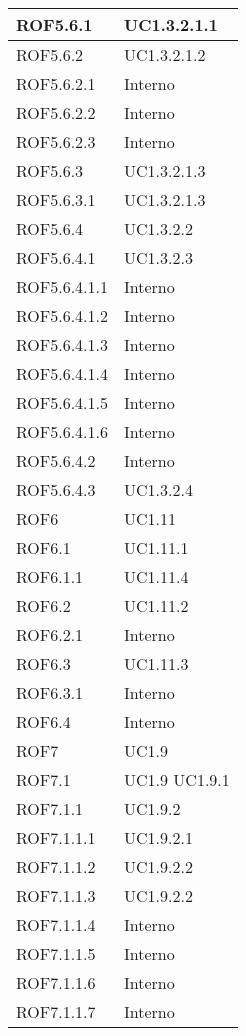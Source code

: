 \begin{center}
\begin{longtable}{| p{4cm} | p{4cm} |}
\hline
ROF5.6.1   &  UC1.3.2.1.1 \\
\hline
ROF5.6.2   &  UC1.3.2.1.2 \\
\hline
ROF5.6.2.1   &  Interno \\
\hline
ROF5.6.2.2   &  Interno \\
\hline
ROF5.6.2.3   &  Interno \\
\hline
ROF5.6.3   &  UC1.3.2.1.3 \\
\hline
ROF5.6.3.1   &  UC1.3.2.1.3 \\
\hline
ROF5.6.4   &  UC1.3.2.2 \\
\hline
ROF5.6.4.1   &  UC1.3.2.3 \\
\hline
ROF5.6.4.1.1   &  Interno \\
\hline
ROF5.6.4.1.2   &  Interno \\
\hline
ROF5.6.4.1.3   &  Interno \\
\hline
ROF5.6.4.1.4   &  Interno \\
\hline
ROF5.6.4.1.5   &  Interno \\
\hline
ROF5.6.4.1.6   &  Interno \\
\hline
ROF5.6.4.2   &  Interno \\
\hline
ROF5.6.4.3   &  UC1.3.2.4 \\
\hline
ROF6   &  UC1.11 \\
\hline
ROF6.1   &  UC1.11.1 \\
\hline
ROF6.1.1   &  UC1.11.4 \\
\hline
ROF6.2   &  UC1.11.2 \\
\hline
ROF6.2.1   &  Interno \\
\hline
ROF6.3   &  UC1.11.3 \\
\hline
ROF6.3.1   &  Interno \\
\hline
ROF6.4   &  Interno \\
\hline
ROF7   &  UC1.9 \\
\hline
ROF7.1   &  UC1.9 \newline UC1.9.1 \\
\hline
ROF7.1.1   &  UC1.9.2  \\
\hline
ROF7.1.1.1   &  UC1.9.2.1 \\
\hline
ROF7.1.1.2   &  UC1.9.2.2 \\
\hline
ROF7.1.1.3   &  UC1.9.2.2 \\
\hline
ROF7.1.1.4   &  Interno \\
\hline
ROF7.1.1.5   &  Interno \\
\hline
ROF7.1.1.6   &  Interno \\
\hline
ROF7.1.1.7   &  Interno \\

\end{longtable}
\end{center}

